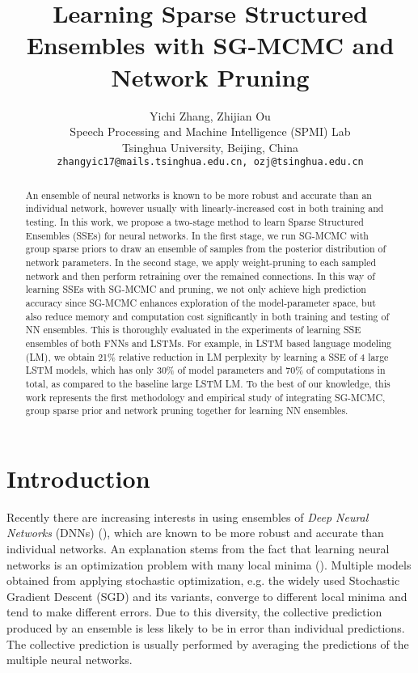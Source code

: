 \documentclass{article} %
\title{Learning Sparse Structured Ensembles with SG-MCMC and Network Pruning}
\author{Yichi Zhang, Zhijian Ou  \\
Speech Processing and Machine Intelligence (SPMI) Lab\\ Tsinghua University, Beijing, China \\
\texttt{zhangyic17@mails.tsinghua.edu.cn, ozj@tsinghua.edu.cn} \\
}
\begin{document}
\maketitle

\begin{abstract}
\label{abs}

An ensemble of neural networks is known to be more robust and accurate than an individual network, however usually with linearly-increased cost in both training and testing. 
In this work, we propose a two-stage method to learn Sparse Structured Ensembles (SSEs) for neural networks.
In the first stage, we run SG-MCMC with group sparse priors to draw an ensemble of samples from the posterior distribution of network parameters. In the second stage, we apply weight-pruning to each sampled network and then perform retraining over the remained connections.
In this way of learning SSEs with SG-MCMC and pruning, we not only achieve high prediction accuracy since SG-MCMC enhances exploration of the model-parameter space, but also reduce memory and computation cost significantly in both training and testing of NN ensembles.
This is thoroughly evaluated in the experiments of learning SSE ensembles of both FNNs and LSTMs.
For example, in LSTM based language modeling (LM), we obtain 21\% relative reduction in LM perplexity by learning a SSE of 4 large LSTM models, which has only 30\% of model parameters and 70\% of computations in total, as compared to the baseline large LSTM LM.
To the best of our knowledge, this work represents the first methodology and empirical study of integrating SG-MCMC, group sparse prior and network pruning together for learning NN ensembles.

\end{abstract}

\section{Introduction}
\label{Intr}

Recently there are increasing interests in using ensembles of \textit{Deep Neural Networks} (DNNs) (\citet{ju2017relative,huang2017snapshot}), which are known to be more robust and accurate than individual networks.
An explanation stems from the fact that learning neural networks is an optimization problem with many local minima (\cite{hansen1990neural}).
Multiple models obtained from applying stochastic optimization, e.g. the widely used Stochastic Gradient Descent (SGD) and its variants, converge to different local minima and tend to make different errors.
Due to this diversity, the collective prediction produced by an ensemble is less likely to be in error than individual predictions. 
The collective prediction is usually performed by averaging the predictions of the multiple neural networks.
\end{document}
